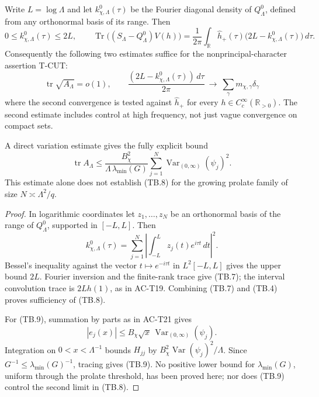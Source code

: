 \begin{proposition}
\label{AC-T23}
Write \(L=\log\Lambda\) and let
\(k^0_{\chi,\Lambda}(\tau)\) be the Fourier diagonal density
of \(Q_\Lambda^0\), defined from any orthonormal basis of its
range.  Then
\[
 0\leq k^0_{\chi,\Lambda}(\tau)\leq2L,\qquad
 \operatorname{Tr}\bigl((S_\Lambda-Q_\Lambda^0)V(h)\bigr)
 =\frac1{2\pi}\int_{\mathbb R}
       \widehat h_+(\tau)\bigl(2L-k^0_{\chi,\Lambda}(\tau)\bigr)
       \,d\tau.
 \tag{TB.7}
\]
Consequently the following two estimates suffice for the
nonprincipal-character assertion T-CUT:
\[
 \operatorname{tr}\sqrt{A_\Lambda}=o(1),\qquad
 \frac{(2L-k^0_{\chi,\Lambda}(\tau))\,d\tau}{2\pi}
  \ \longrightarrow\ \sum_\gamma m_{\chi,\gamma}\delta_\gamma
 \tag{TB.8}
\]
where the second convergence is tested against
\(\widehat h_+\) for every \(h\in C_c^\infty(\mathbb R_{>0})\).
The second estimate includes control at high frequency,
not just vague convergence on compact sets.

A direct variation estimate gives the fully explicit bound
\[
 \operatorname{tr}A_\Lambda
 \leq\frac{B_\chi^2}{\Lambda\,\lambda_{\min}(G)}
        \sum_{j=1}^N
          \operatorname{Var}_{(0,\infty)}(\psi_j)^2 .
 \tag{TB.9}
\]
This estimate alone does not establish (TB.8) for the
growing prolate family of size \(N\asymp\Lambda^2/q\).
\end{proposition}
\begin{proof}
In logarithmic coordinates let \(z_1,\ldots,z_N\) be an
orthonormal basis of the range of \(Q_\Lambda^0\),
supported in \([-L,L]\).
Then
\[
 k^0_{\chi,\Lambda}(\tau)
       =\sum_{j=1}^N\left|
                  \int_{-L}^Lz_j(t)e^{i\tau t}\,dt\right|^2.
 \]
Bessel's inequality against the vector
\(t\mapsto e^{-i\tau t}\) in \(L^2[-L,L]\) gives the upper
bound \(2L\).  Fourier inversion and the finite-rank trace
give (TB.7); the interval convolution trace is
\(2Lh(1)\), as in AC-T19.
Combining (TB.7) and (TB.4) proves sufficiency of (TB.8).

For (TB.9), summation by parts as in AC-T21 gives
\[
 |e_j(x)|\leq B_\chi\sqrt{x}\,
                     \operatorname{Var}_{(0,\infty)}(\psi_j).
 \]
Integration on \(0<x<\Lambda^{-1}\) bounds \(H_{jj}\)
by \(B_\chi^2\operatorname{Var}(\psi_j)^2/\Lambda\).
Since \(G^{-1}\leq\lambda_{\min}(G)^{-1}\), tracing gives
(TB.9).  No positive lower bound for
\(\lambda_{\min}(G)\), uniform through the prolate threshold,
has been proved here; nor does (TB.9) control the second
limit in (TB.8).
\end{proof}

